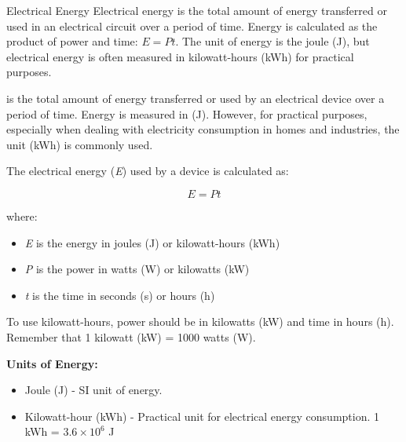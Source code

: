 \begin{keyconcept}{Electrical Energy}
Electrical energy is the total amount of energy transferred or used in an electrical circuit over a period of time.  Energy is calculated as the product of power and time: $E = Pt$. The unit of energy is the joule (J), but electrical energy is often measured in kilowatt-hours (kWh) for practical purposes. 
\end{keyconcept}

 is the total amount of energy transferred or used by an electrical device over a period of time.  Energy is measured in  (J).  However, for practical purposes, especially when dealing with electricity consumption in homes and industries, the unit  (kWh) is commonly used.

The electrical energy (\textit{E}) used by a device is calculated as:

$$E = Pt$$

where:
\begin{itemize}
    \item \textit{E} is the energy in joules (J) or kilowatt-hours (kWh)
    \item \textit{P} is the power in watts (W) or kilowatts (kW)
    \item \textit{t} is the time in seconds (s) or hours (h)
\end{itemize}

To use kilowatt-hours, power should be in kilowatts (kW) and time in hours (h). Remember that 1 kilowatt (kW) = 1000 watts (W).

\begin{marginnote}
\textbf{Units of Energy:}
\begin{itemize}
    \item Joule (J) - SI unit of energy.
    \item Kilowatt-hour (kWh) - Practical unit for electrical energy consumption.
    1 kWh = $3.6 \times 10^6$ J
\end{itemize}
\end{marginnote}

